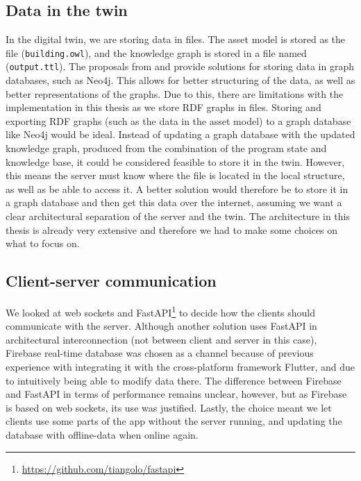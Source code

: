 \documentclass{article}
\begin{document}
\subsection{Data in the twin}\label{subsec:StoringData}
In the digital twin, we are storing data in files. The asset model is stored as the file (\verb|building.owl|), and the knowledge graph is stored in a file named (\verb|output.ttl|). The proposals from \citeauthor{waszak_let_2022} and \citeauthor{gulnes_graph-based_2020} provide solutions for storing data in graph databases, such as Neo4j. This allows for better structuring of the data, as well as better representations of the graphs. Due to this, there are limitations with the implementation in this thesis as we store RDF graphs in files. Storing and exporting RDF graphs (such as the data in the asset model) to a graph database like Neo4j would be ideal. Instead of updating a graph database with the updated knowledge graph, produced from the combination of the program state and knowledge base, it could be considered feasible to store it in the twin. However, this means the server must know where the file is located in the local structure, as well as be able to access it. A better solution would therefore be to store it in a graph database and then get this data over the internet, assuming we want a clear architectural separation of the server and the twin. The architecture in this thesis is already very extensive and therefore we had to make some choices on what to focus on.


\subsection{Client-server communication}\label{subsec:ClientServerCommunication}
We looked at web sockets and FastAPI\footnote{\url{https://github.com/tiangolo/fastapi}} to decide how the clients should communicate with the server. Although another solution \cite{waszak_let_2022} uses FastAPI in architectural interconnection (not between client and server in this case), Firebase real-time database was chosen as a channel because of previous experience with integrating it with the cross-platform framework Flutter, and due to intuitively being able to modify data there. The difference between Firebase and FastAPI in terms of performance remains unclear, however, but as Firebase is based on web sockets, its use was justified. Lastly, the choice meant we let clients use some parts of the app without the server running, and updating the database with offline-data when online again.
\end{document}
